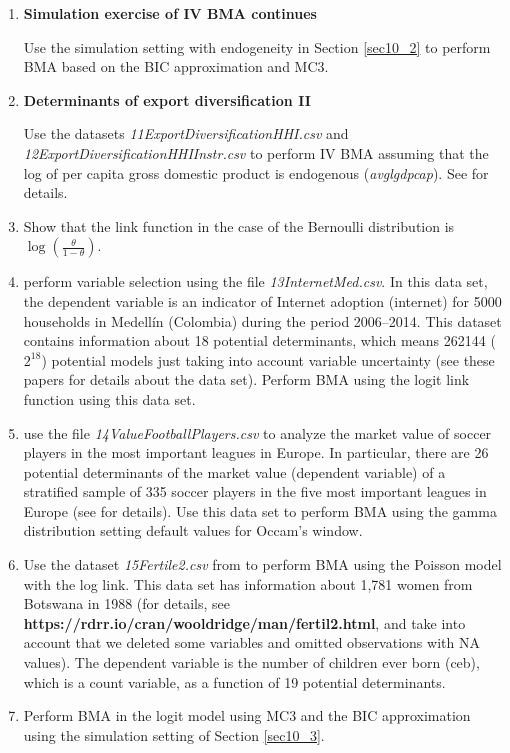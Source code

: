 \begin{enumerate}
\item \textbf{Simulation exercise of IV BMA continues}

Use the simulation setting with endogeneity in Section \ref{sec10_2} to perform BMA based on the BIC approximation and MC3.

\item \textbf{Determinants of export diversification II}

Use the datasets \textit{11ExportDiversificationHHI.csv} and \textit{12ExportDiversificationHHIInstr.csv} to perform IV BMA assuming that the log of per capita gross domestic product is endogenous (\textit{avglgdpcap}). See \cite{Jetter2015} for details.

\item Show that the link function in the case of the Bernoulli distribution is $\log\left(\frac{\theta}{1-\theta}\right)$.

\item \cite{ramirez2020dynamic,ramirez2021specification} perform variable selection using the file \textit{13InternetMed.csv}. In this data set, the dependent variable is an indicator of Internet adoption (internet) for 5000 households in Medell\'in (Colombia) during the period 2006--2014. This dataset contains information about 18 potential determinants, which means 262144 ($2^{18}$) potential models just taking into account variable uncertainty (see these papers for details about the data set). Perform BMA using the logit link function using this data set.  

\item \cite{Serna2018} use the file \textit{14ValueFootballPlayers.csv} to analyze the market value of soccer players in the most important leagues in Europe. In particular, there are 26 potential determinants of the market value (dependent variable) of a stratified sample of 335 soccer players in the five most important leagues in Europe (see \cite{Serna2018} for details). Use this data set to perform BMA using the gamma distribution setting default values for Occam's window.  

\item Use the dataset \textit{15Fertile2.csv} from \cite[p.~547]{Wooldridge2012} to perform BMA using the Poisson model with the log link. This data set has information about 1,781 women from Botswana in 1988 (for details, see \textbf{https://rdrr.io/cran/wooldridge/man/fertil2.html}, and take into account that we deleted some variables and omitted observations with NA values). The dependent variable is the number of children ever born (ceb), which is a count variable, as a function of 19 potential determinants.

\item Perform BMA in the logit model using MC3 and the BIC approximation using the simulation setting of Section \ref{sec10_3}.        
	
\end{enumerate}
